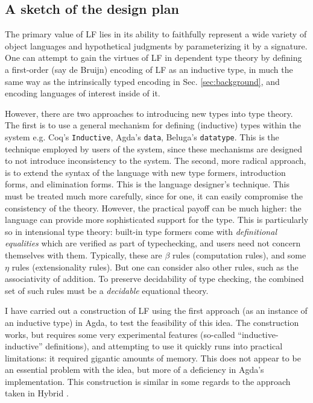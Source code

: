 \documentclass{article}
\begin{document}
\subsection{A sketch of the design plan}\label{sec:proposedtheory}

The primary value of LF lies in its ability to faithfully represent a wide
variety of object languages and hypothetical judgments by
parameterizing it by a signature. One can attempt to
gain the virtues of LF in dependent type theory by defining a
first-order (say de Bruijn) encoding of LF as an inductive type, in
much the same way as the intrinsically typed encoding in 
Sec. \ref{sec:background}, and encoding languages of interest
inside of it.

However, there are two approaches to introducing new types
into type theory. The first is to use a general mechanism for defining
(inductive) types within the system e.g. Coq's \verb|Inductive|, Agda's
\verb|data|, Beluga's \verb|datatype|. This is the technique employed by
users of the system, since these mechanisms are designed to not
introduce inconsistency to the system. The second, more radical approach, is to extend the syntax of the
language with new type formers, introduction forms, and elimination
forms. This is the language designer's technique. This must be treated
much more carefully, since for one, it can easily compromise the consistency of
the theory. However, the practical payoff can be much higher: the language
can provide more sophisticated support for the type. This is
particularly so in intensional type theory: built-in type
formers come with \emph{definitional equalities} which are verified as
part of typechecking, and users need not concern themselves with
them. Typically, these are $\beta$ rules (computation rules), and some
$\eta$ rules (extensionality rules). But one can consider also other rules,
such as the associativity of addition. To preserve decidability of
type checking, the combined set of such rules must be a
\emph{decidable} equational theory.

I have carried out a construction of LF using the first approach (as
an instance of an inductive type) in Agda, to test the feasibility of
this idea. The construction works, but requires some very experimental
features (so-called ``inductive-inductive'' definitions), and attempting to use it quickly
runs into practical limitations: it required gigantic amounts of
memory. This does not appear to be an essential problem with the
idea, but more of a deficiency in Agda's implementation. This
construction is similar in some regards to the approach taken in
Hybrid \citep{Felty12}.
\end{document}
